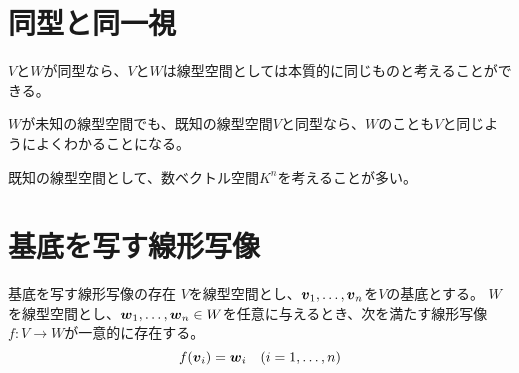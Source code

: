 \documentclass[../../../topic_linear-algebra]{subfiles}
\begin{document}
\sectionline
\section{同型と同一視}

$V$と$W$が同型なら、$V$と$W$は線型空間としては本質的に同じものと考えることができる。

$W$が未知の線型空間でも、既知の線型空間$V$と同型なら、$W$のことも$V$と同じようによくわかることになる。

\br

既知の線型空間として、数ベクトル空間$K^n$を考えることが多い。

\sectionline
\section{基底を写す線形写像}

\begin{theorem*}{基底を写す線形写像の存在}
  $V$を線型空間とし、$\vb*{v}_1, \ldots, \vb*{v}_n$を$V$の基底とする。
  $W$を線型空間とし、$\vb*{w}_1, \ldots, \vb*{w}_n \in W$を任意に与えるとき、次を満たす線形写像$f\colon V \to W$が一意的に存在する。
  \begin{equation*}
    f(\vb*{v}_i) = \vb*{w}_i \quad (i = 1, \ldots, n)
  \end{equation*}
\end{theorem*}
\end{document}
